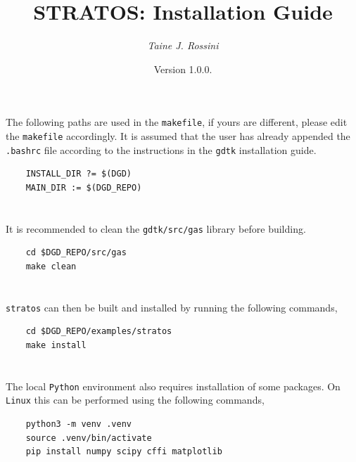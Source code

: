 \documentclass[10pt,a4paper]{article}
\title{STRATOS: Installation Guide}
\author{\textit{Taine J. Rossini}}
\date{Version 1.0.0.}
\begin{document}
\maketitle

\section{}

The following paths are used in the \texttt{makefile}, if yours are different, please edit the \texttt{makefile} accordingly. It is assumed that the user has already appended the \texttt{.bashrc} file according to the instructions in the \texttt{gdtk} installation guide.

\begin{verbatim}
    INSTALL_DIR ?= $(DGD)
    MAIN_DIR := $(DGD_REPO)
\end{verbatim}

\section{}

It is recommended to clean the \texttt{gdtk/src/gas} library before building.

\begin{verbatim}
    cd $DGD_REPO/src/gas
    make clean
\end{verbatim}

\section{}

\texttt{stratos} can then be built and installed by running the following commands,

\begin{verbatim}
    cd $DGD_REPO/examples/stratos
    make install
\end{verbatim}

\section{}

The local \texttt{Python} environment also requires installation of some packages. On \texttt{Linux} this can be performed using the following commands,

\begin{verbatim}
    python3 -m venv .venv
    source .venv/bin/activate
    pip install numpy scipy cffi matplotlib
\end{verbatim}
\end{document}

